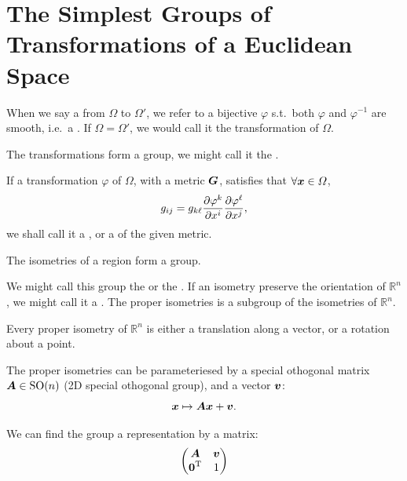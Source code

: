 \documentclass[openany]{book}
\begin{document}
\section{The Simplest Groups of Transformations of a Euclidean Space}

When we say a  from $\varOmega$ to $\varOmega'$, we refer to a bijective $\varphi$ s.t.\ both $\varphi$ and $\varphi^{-1}$ are smooth, i.e.\ a . 
If $\varOmega = \varOmega'$, we would call it the transformation of $\varOmega$.

The transformations form a group, we might call it the . 

\begin{definition}[Isometry]
	If a transformation $\varphi$ of $\varOmega$, with a metric $\boldsymbol{G}$, satisfies that $\forall \boldsymbol{x} \in \varOmega$, 
	\begin{equation*}
		g_{ij} = g_{k \ell} \pdiff{\varphi^k}{x^i} \pdiff{\varphi^\ell}{x^j},
	\end{equation*}
	we shall call it a , or a  of the given metric.
\end{definition}

\begin{theorem}
	The isometries of a region form a group.
\end{theorem}

We might call this group the  or the . 
If an isometry preserve the orientation of $\mathbb R^n$, we might call it a . 
The proper isometries is a subgroup of the isometries of $\mathbb R^n$.

\begin{lemma}
	Every proper isometry of $\mathbb R^n$ is either a translation along a vector, or a rotation about a point.
\end{lemma}

The proper isometries can be parameteriesed by a special othogonal matrix $\boldsymbol{A} \in \operatorname{SO}(n)$ (2D special othogonal group), and a vector $\boldsymbol{v}$:
\begin{equation*}
	\boldsymbol{x} \mapsto \boldsymbol{A} \boldsymbol{x} + \boldsymbol{v}.
\end{equation*}

We can find the group a representation by a matrix:
\begin{equation}\label{equation: representation of isometry group}
	\begin{pmatrix}
		\boldsymbol{A} & \boldsymbol{v} \\
		\boldsymbol{0}^\mathrm T & 1
	\end{pmatrix}
\end{equation}
\end{document}
